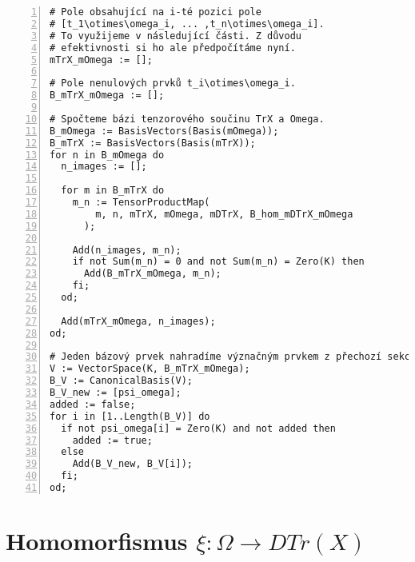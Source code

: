       \begin{Verbatim}[frame=single,numbers=left]
# Pole obsahující na i-té pozici pole
# [t_1\otimes\omega_i, ... ,t_n\otimes\omega_i].
# To využijeme v následující části. Z důvodu
# efektivnosti si ho ale předpočítáme nyní.
mTrX_mOmega := [];

# Pole nenulových prvků t_i\otimes\omega_i.
B_mTrX_mOmega := [];

# Spočteme bázi tenzorového součinu TrX a Omega.
B_mOmega := BasisVectors(Basis(mOmega));
B_mTrX := BasisVectors(Basis(mTrX));
for n in B_mOmega do
  n_images := [];

  for m in B_mTrX do
    m_n := TensorProductMap(
        m, n, mTrX, mOmega, mDTrX, B_hom_mDTrX_mOmega
      );

    Add(n_images, m_n);
    if not Sum(m_n) = 0 and not Sum(m_n) = Zero(K) then
      Add(B_mTrX_mOmega, m_n);
    fi;
  od;

  Add(mTrX_mOmega, n_images);
od;

# Jeden bázový prvek nahradíme význačným prvkem z přechozí sekce.
V := VectorSpace(K, B_mTrX_mOmega);
B_V := CanonicalBasis(V);
B_V_new := [psi_omega];
added := false;
for i in [1..Length(B_V)] do
  if not psi_omega[i] = Zero(K) and not added then
    added := true;
  else
    Add(B_V_new, B_V[i]);
  fi;
od;
      \end{Verbatim}
          
  \section{Homomorfismus $\xi:\Omega\rightarrow DTr(X)$} 
  
